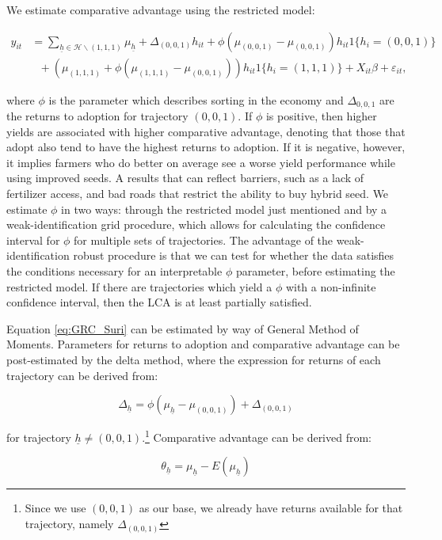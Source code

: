 \documentclass[11pt]{article}
\begin{document}
We estimate comparative advantage using the restricted model:

\begin{align}
y_{it}&=\sum_{\underline{h}\in\mathcal{H}\backslash (1,1,1)}\mu_{\underline{h}}+\Delta_{(0,0,1)}h_{it}+\phi(\mu_{(0,0,1)}-\mu_{(0,0,1)})h_{it}1\{h_{i}=(0,0,1)\}\nonumber\\
&~~~+\left(\mu_{(1,1,1)}+\phi\left(\mu_{(1,1,1)}-\mu_{(0,0,1)}\right)\right)h_{it}1\{h_{i}=(1,1,1)\} + X_{it}\beta +\varepsilon_{it},\label{eq:GRC_Suri}
\end{align}

where $\phi$ is the parameter which describes sorting in the economy and $\Delta_{0,0,1}$ are the returns to adoption for trajectory $(0,0,1)$. If $\phi$ is positive, then higher yields are associated with higher comparative advantage, denoting that those that adopt also tend to have the highest returns to adoption. If it is negative, however, it implies farmers who do better on average see a worse yield performance while using improved seeds. A results that can reflect  barriers, such as a lack of fertilizer access, and bad roads that restrict the ability to buy hybrid seed. We estimate $\phi$ in two ways: through the restricted model just mentioned and by a weak-identification grid procedure, which allows for calculating the confidence interval for $\phi$ for multiple sets of trajectories. The advantage of the weak-identification robust procedure is that we can test for whether the data satisfies the conditions necessary for an interpretable $\phi$ parameter, before estimating the restricted model. If there are trajectories which yield a $\phi$ with a non-infinite confidence interval, then the LCA is at least partially satisfied.

Equation \ref{eq:GRC_Suri} can be estimated by way of General Method of Moments. Parameters for returns to adoption and comparative advantage can be post-estimated by the delta method, where the expression for returns of each trajectory can be derived from:

$$
\Delta_{\underline{h}}=\phi\left(\mu_{\underline{h}}-\mu_{(0,0,1)}\right) + \Delta_{(0,0,1)}
$$

for trajectory $\underline{h} \neq (0,0,1)$.\footnote{Since we use $(0,0,1)$ as our base, we already have returns available for that trajectory, namely $\Delta_{(0,0,1)}$} Comparative advantage can be derived from:

$$
\theta_{\underline{h}} = \mu_{\underline{h}} - E(\mu_{\underline{h}})
$$
\end{document}

